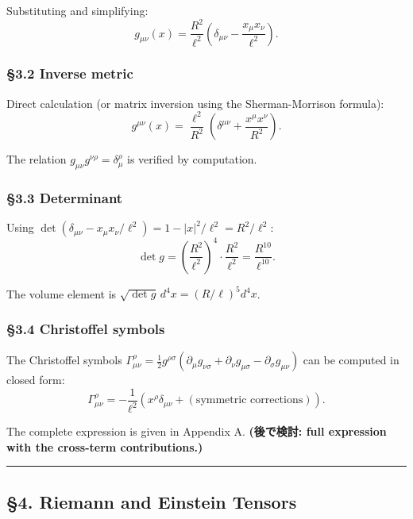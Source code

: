\documentclass[a4paper,11pt]{article}
\theoremstyle{definition}
\begin{document}
Substituting and simplifying:
\[\boxed{\;g_{\mu\nu}(x) = \frac{R^2}{\ell^2}\left(\delta_{\mu\nu} - \frac{x_\mu x_\nu}{\ell^2}\right).\;}\]

\subsubsection{§3.2 Inverse metric}\label{inverse-metric}

Direct calculation (or matrix inversion using the Sherman-Morrison
formula):
\[g^{\mu\nu}(x) = \frac{\ell^2}{R^2}\left(\delta^{\mu\nu} + \frac{x^\mu x^\nu}{R^2}\right).\]

The relation \(g_{\mu\nu} g^{\nu\rho} = \delta_\mu^\rho\) is verified by
computation.

\subsubsection{§3.3 Determinant}\label{determinant}

Using
\(\det(\delta_{\mu\nu} - x_\mu x_\nu / \ell^2) = 1 - |x|^2/\ell^2 = R^2/\ell^2\):
\[\det g = \left(\frac{R^2}{\ell^2}\right)^4 \cdot \frac{R^2}{\ell^2} = \frac{R^{10}}{\ell^{10}}.\]

The volume element is \(\sqrt{\det g}\, d^4 x = (R/\ell)^5 d^4 x\).

\subsubsection{§3.4 Christoffel symbols}\label{christoffel-symbols}

The Christoffel symbols
\(\Gamma^\rho_{\mu\nu} = \frac{1}{2} g^{\rho\sigma}(\partial_\mu g_{\nu\sigma} + \partial_\nu g_{\mu\sigma} - \partial_\sigma g_{\mu\nu})\)
can be computed in closed form:
\[\Gamma^\rho_{\mu\nu} = -\frac{1}{\ell^2}\left(x^\rho \delta_{\mu\nu} + (\text{symmetric corrections})\right).\]

The complete expression is given in Appendix A. \textbf{(後で検討: full
expression with the cross-term contributions.)}

\begin{center}\rule{0.5\linewidth}{0.5pt}\end{center}

\subsection{§4. Riemann and Einstein
Tensors}\label{riemann-and-einstein-tensors}
\end{document}
